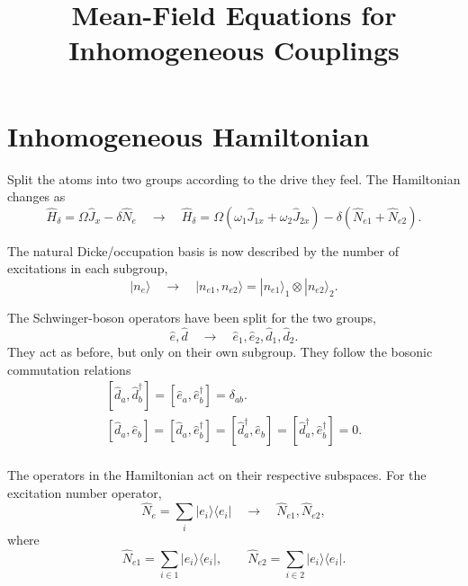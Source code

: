 \documentclass[11pt]{article}
\title{Mean-Field Equations for Inhomogeneous Couplings}
\author{}
\date{}
\begin{document}
\maketitle


\section{Inhomogeneous Hamiltonian}

Split the atoms into two groups according to the drive they feel. The Hamiltonian changes as
\begin{equation}
\hat{H}_{\delta}
=
\Omega \hat{J}_x
-
\delta \hat{N}_e
\quad
\rightarrow
\quad
\hat{H}_{\delta}
=
\Omega
(
\omega_1 \hat{J}_{1x}
+
\omega_2 \hat{J}_{2x}
)
-
\delta
(
\hat{N}_{e1}
+
\hat{N}_{e2}
).
\end{equation}

The natural Dicke/occupation basis is now described by the number of excitations in each subgroup,
\begin{equation}
|n_e\rangle
\quad
\rightarrow
\quad
|n_{e1},n_{e2}\rangle
=
|n_{e1}\rangle_1
\otimes
|n_{e2}\rangle_2.
\end{equation}

The Schwinger-boson operators have been split for the two groups,
\begin{equation}
\hat{e},\hat{d}
\quad
\rightarrow
\quad
\hat{e}_1,\hat{e}_2,\hat{d}_1,\hat{d}_2.
\end{equation}
They act as before, but only on their own subgroup. They follow the bosonic commutation relations
\begin{equation} \label{eq:bosonic_commutation_relations}
\begin{gathered}
[\hat{d}_a,\hat{d}_b^{\dagger}]
=
[\hat{e}_a,\hat{e}_b^{\dagger}]
=
\delta_{ab}.
\\
[\hat{d}_a,\hat{e}_b]
=
[\hat{d}_a,\hat{e}_b^{\dagger}]
=
[\hat{d}_a^{\dagger},\hat{e}_b]
=
[\hat{d}_a^{\dagger},\hat{e}_b^{\dagger}]
=
0.
\end{gathered}
\end{equation}
\\
The operators in the Hamiltonian act on their respective subspaces. For the excitation number operator,
\begin{equation}
\hat{N}_e
=
\sum_i |e_i\rangle\langle e_i|
\quad
\rightarrow
\quad
\hat{N}_{e1},
\hat{N}_{e2},
\end{equation}
where
\begin{equation}
\hat{N}_{e1}
=
\sum_{i\in 1}
|e_i\rangle\langle e_i|,
\qquad
\hat{N}_{e2}
=
\sum_{i\in 2}
|e_i\rangle\langle e_i|.
\end{equation}
\end{document}
